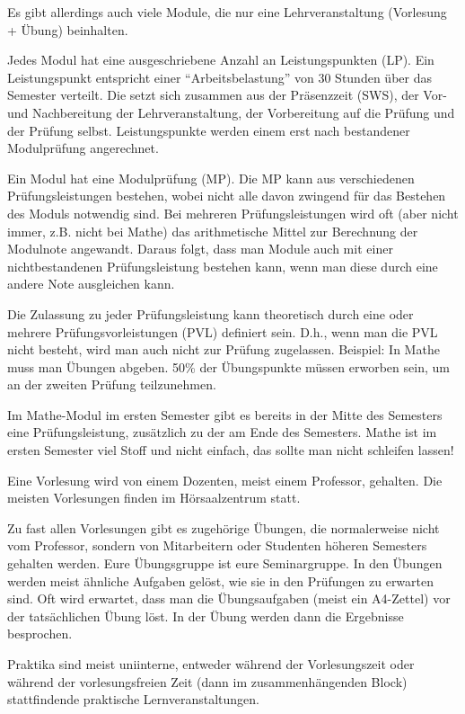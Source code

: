 \documentclass[a4paper,12pt]{report}
\begin{document}
\begin{itemize*}
\item Es gibt allerdings auch viele Module, die nur eine Lehrveranstaltung (Vorlesung + Übung) beinhalten.
\item Jedes Modul hat eine ausgeschriebene Anzahl an Leistungspunkten (LP). Ein Leistungspunkt entspricht einer ``Arbeitsbelastung'' von 30 Stunden über das Semester verteilt. Die setzt sich zusammen aus der Präsenzzeit (SWS), der Vor- und Nachbereitung der Lehrveranstaltung, der Vorbereitung auf die Prüfung und der Prüfung selbst. Leistungspunkte werden einem erst nach bestandener Modulprüfung angerechnet.
\item Ein Modul hat eine Modulprüfung (MP). Die MP kann aus verschiedenen Prüfungsleistungen bestehen, wobei nicht alle davon zwingend für das Bestehen des Moduls notwendig sind. Bei mehreren Prüfungsleistungen wird oft (aber nicht immer, z.B. nicht bei Mathe) das arithmetische Mittel zur Berechnung der Modulnote angewandt. Daraus folgt, dass man Module auch mit einer nichtbestandenen Prüfungsleistung bestehen kann, wenn man diese durch eine andere Note ausgleichen kann.
\item Die Zulassung zu jeder Prüfungsleistung kann theoretisch durch eine oder mehrere Prüfungsvorleistungen (PVL) definiert sein. D.h., wenn man die PVL nicht besteht, wird man auch nicht zur Prüfung zugelassen. Beispiel: In Mathe muss man Übungen abgeben. 50\% der Übungspunkte müssen erworben sein, um an der zweiten Prüfung teilzunehmen.
\item Im Mathe-Modul im ersten Semester gibt es bereits in der Mitte des Semesters eine Prüfungsleistung, zusätzlich zu der am Ende des Semesters. Mathe ist im ersten Semester viel Stoff und nicht einfach, das sollte man nicht schleifen lassen!
\item Eine Vorlesung wird von einem Dozenten, meist einem Professor, gehalten. Die meisten Vorlesungen finden im Hörsaalzentrum statt.
\item Zu fast allen Vorlesungen gibt es zugehörige Übungen, die normalerweise nicht vom Professor, sondern von Mitarbeitern oder Studenten höheren Semesters gehalten werden. Eure Übungsgruppe ist eure Seminargruppe. In den Übungen werden meist ähnliche Aufgaben gelöst, wie sie in den Prüfungen zu erwarten sind. Oft wird erwartet, dass man die Übungsaufgaben (meist ein A4-Zettel) vor der tatsächlichen Übung löst. In der Übung werden dann die Ergebnisse besprochen.
\item Praktika sind meist uniinterne, entweder während der Vorlesungszeit oder während der vorlesungsfreien Zeit (dann im zusammenhängenden Block) stattfindende praktische Lernveranstaltungen.

\end{itemize*}
\end{document}
